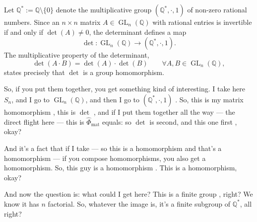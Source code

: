 \begin{content}
Let $\mathbb{Q}^* := \mathbb{Q} \setminus \{0\}$ denote the multiplicative group $(\mathbb{Q}^*, \cdot, 1)$ of non-zero rational numbers. Since an $n \times n$ matrix $A \in \operatorname{GL}_n(\mathbb{Q})$ with rational entries is invertible if and only if $\det(A) \neq 0$, the determinant defines a map
\[
\det \colon \operatorname{GL}_n(\mathbb{Q}) \longrightarrow (\mathbb{Q}^*, \cdot, 1).
\]
The multiplicative property of the determinant,
\[
\det(A \cdot B) = \det(A) \cdot \det(B) \qquad \forall A, B \in \operatorname{GL}_n(\mathbb{Q}),
\]
states precisely that $\det$ is a group homomorphism.
\end{content}

\begin{speech}[00:18:32 - 00:19:50]
So, if you put them together, you get something kind of interesting. I take here $S_n$, and I go to $\operatorname{GL}_n(\mathbb{Q})$, and then I go to $(\mathbb{Q}^*, \cdot, 1)$ . So, this is my matrix homomorphism , this is $\det$ , and if I put them together all the way --- the direct flight here --- this is $\hat{\Phi}_{\text{mat}}$ equals: so $\det$ is second, and this one first , okay?

And it's a fact that if I take --- so this is a homomorphism  and that's a homomorphism  --- if you compose homomorphisms, you also get a homomorphism. So, this guy is a homomorphism . This is a homomorphism, okay?

And now the question is: what could I get here? This is a finite group , right? We know it has $n$ factorial. So, whatever the image is, it's a finite subgroup of $\mathbb{Q}^*$, all right?
\end{speech}

